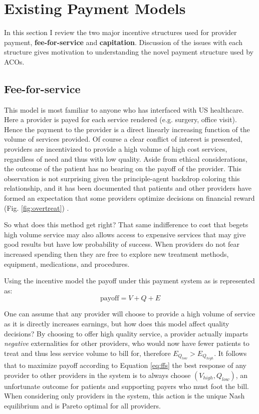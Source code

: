 \documentclass{article}
\begin{document}
\section{Existing Payment Models}
In this section I review the two major incentive structures used for provider payment, \textbf{fee-for-service} and \textbf{capitation}. Discussion of the issues with each structure gives motivation to understanding the novel payment structure used by ACOs.

\subsection{Fee-for-service}
This model is most familiar to anyone who has interfaced with US healthcare. Here a provider is payed for each service rendered (e.g. surgery, office visit). Hence the payment to the provider is a direct linearly increasing function of the volume of services provided. Of course a clear conflict of interest is presented, providers are incentivized to provide a high volume of high cost services, regardless of need and thus with low quality. Aside from ethical considerations, the outcome of the patient has no bearing on the payoff of the provider. This observation is not surprising given the principle-agent backdrop coloring this relationship, and it has been documented that patients and other providers have formed an expectation that some providers optimize decisions on financial reward (Fig. \ref{fig:overtreat}) \cite{econharvard}\cite{overtreat}.

So what does this method get right? That same indifference to cost that begets high volume service may also allows access to expensive services that may give good results but have low probability of success. When providers do not fear increased spending then they are free to explore new treatment methods, equipment, medications, and procedures.

Using the incentive model the payoff under this payment system as is represented as:
\begin{equation} \label{eq:ffs}
    \text{payoff} = V + Q + E
\end{equation}

One can assume that any provider will choose to provide a high volume of service as it is directly increases earnings, but how does this model affect quality decisions? By choosing to offer high quality service, a provider actually imparts \emph{negative} externalities for other providers, who would now have fewer patients to treat and thus less service volume to bill for, therefore $E_{Q_{low}} > E_{Q_{high}}$. It follows that to maximize payoff according to Equation \ref{eq:ffs} the best response of any provider to other providers in the system is to always choose $(V_{high}, Q_{low})$, an unfortunate outcome for patients and supporting payers who must foot the bill. When considering only providers in the system, this action is the unique Nash equilibrium \cite{blended} and is Pareto optimal for all providers.
\end{document}
